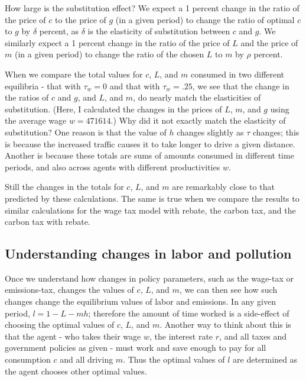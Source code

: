\documentclass[letter, 12pt, epsf,leqno]{article}
\begin{document}
How large is the substitution effect?  We expect a 1 percent change in the ratio of the price of $c$ to the price of $g$ (in a given period) to change the ratio of optimal $c$ to $g$ by $\delta$ percent, as $\delta$ is the elasticity of substitution between $c$ and $g$.  We similarly expect a 1 percent change in the ratio of the price of $L$ and the price of $m$ (in a given period) to change the ratio of the chosen $L$ to $m$ by $\rho$ percent.

When we compare the total values for $c$, $L$, and $m$ consumed in two different equilibria - that with $\tau_w=0$ and that with $\tau_w=.25$, we see that the change in the ratios of $c$ and $g$, and $L$, and $m$, do nearly match the elasticities of substitution.  (Here, I calculated the changes in the prices of $L$, $m$, and $g$ using the average wage $w=471614$.)  Why did it not exactly match the elasticity of substitution?  One reason is that the value of $h$ changes slightly as $\tau$ changes; this is because the increased traffic causes it to take longer to drive a given distance.    Another is because these totals are sums of amounts consumed in different time periods, and also across agents with different productivities $w$. %

Still the changes in the totals for $c$, $L$, and $m$ are remarkably close to that predicted by these calculations.  The same is true when we compare the results to similar calculations for the wage tax model with rebate, the carbon tax, and the carbon tax with rebate. 

\subsection{Understanding changes in labor and pollution}

Once we understand how changes in policy parameters, such as the wage-tax or emissions-tax, changes the values of $c$, $L$, and $m$, we can then see how such changes change the equilibrium values of labor and emissions.  In any given period, $l=1-L-mh$; therefore the amount of time worked is a side-effect of choosing the optimal values of $c$, $L$, and $m$.  Another way to think about this is that the agent - who takes their wage $w$, the interest rate $r$, and all taxes and government policies as given - must work and save enough to pay for all consumption $c$ and all driving $m$.  Thus the optimal values of $l$ are determined as the agent chooses other optimal values.
\end{document}
